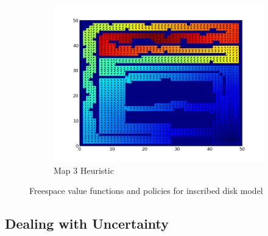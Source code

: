 \documentclass{article}
\begin{document}
\begin{figure}[ht]
\begin{subfigure}[b]{0.45\textwidth}
        \includegraphics[width = \textwidth]{map3value.png}
        \caption{Map 3 Heuristic}
        \label{fig:map3value}
    \end{subfigure}
    \caption{Freespace value functions and policies for inscribed disk model}
    \label{fig:valuefcns}
\end{figure}

\subsection{Dealing with Uncertainty}
\end{document}
